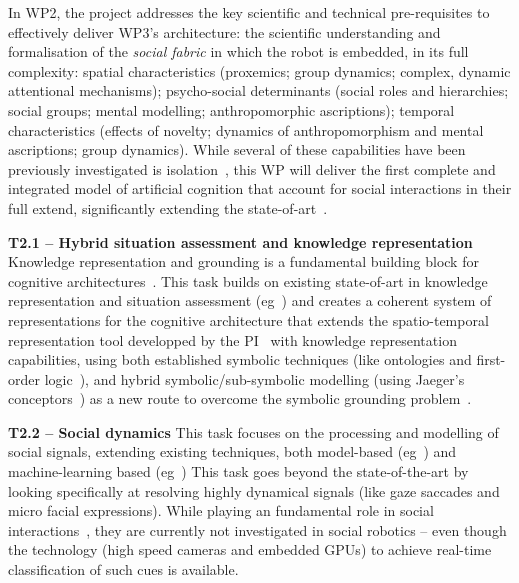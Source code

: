 \documentclass[11pt,a4paper]{report}
\begin{document}
\noindent{}

In WP2, the project addresses the key scientific and technical pre-requisites to
effectively deliver WP3's architecture:  the scientific understanding and
formalisation of the \emph{social fabric} in which the robot is embedded, in its
full complexity: spatial characteristics (proxemics; group dynamics; complex,
dynamic attentional mechanisms); psycho-social determinants (social roles and
hierarchies; social groups; mental modelling; anthropomorphic ascriptions);
temporal characteristics (effects of novelty; dynamics of anthropomorphism and
mental ascriptions; group dynamics).  While several of these capabilities have
been previously investigated is isolation~\cite{lemaignan2014dynamics,
flook2019impact,lemaignan2015youre, fink2014which, ros2010which,
warnier2012when, lemaignan2015mutual, dillenbourg2016symmetry,
winkle2019effective}, this WP will deliver the first complete and integrated
model of artificial cognition that account for social interactions in their full
extend, significantly extending the state-of-art~\cite{lemaignan2017artificial,
baxter2016cognitive}.


\textbf{T2.1 -- Hybrid situation assessment and knowledge representation}
Knowledge representation and grounding is a fundamental building block for
cognitive architectures~\cite{lemaignan2017artificial,beetz2010cram}. This task
builds on existing state-of-art in knowledge representation and situation
assessment (eg~\cite{citeneeded}) and creates a coherent system of
representations for the cognitive architecture that extends the 
spatio-temporal representation tool developped by the
PI~\cite{lemaignan2018underworlds,sallami2019simulation} with knowledge
representation capabilities, using both established symbolic techniques (like
ontologies and first-order logic~\cite{lemaignan2010oro, tenorth2009knowrob}),
and hybrid symbolic/sub-symbolic modelling (using Jaeger's
conceptors~\cite{jaeger2014controlling}) as a new route to overcome the symbolic
grounding problem~\cite{harnad1990symbol}.

\textbf{T2.2 -- Social dynamics} This task focuses on the processing and
modelling of social signals, extending existing techniques, both model-based
(eg~\cite{lemaignan2016realtime,others}) and machine-learning based
(eg~\cite{chetouani,others}) This task goes beyond the state-of-the-art by
looking specifically at resolving highly dynamical signals (like gaze saccades
and micro facial expressions). While playing an fundamental role in social
interactions~\cite{citeneeded}, they are currently not investigated in social
robotics -- even though the technology (high speed cameras and embedded GPUs) to
achieve real-time classification of such cues is available.
\end{document}
